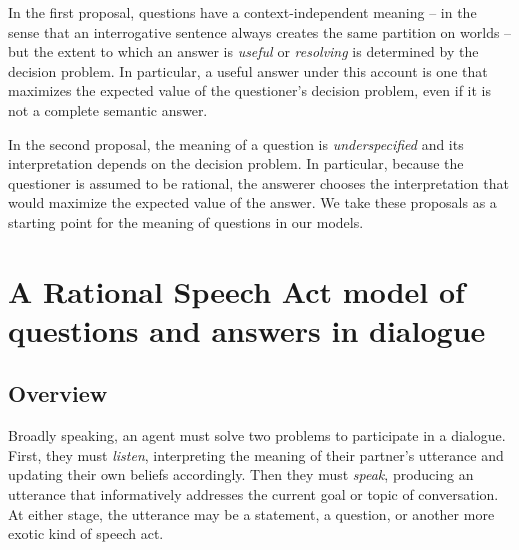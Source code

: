 \documentclass[12pt, floatsintext, jou]{apa6}
\begin{document}
In the first proposal, questions have a context-independent meaning -- in the sense that an interrogative sentence always creates the same partition on worlds -- but the extent to which an answer is \emph{useful} or \emph{resolving} is determined by the decision problem. In particular, a useful answer under this account is one that maximizes the expected value of the questioner's decision problem, even if it is not a complete semantic answer. 

In the second proposal, the meaning of a question is \emph{underspecified} and its interpretation depends on the decision problem. In particular, because the questioner is assumed to be rational, the answerer chooses the interpretation that would maximize the expected value of the answer. We take these proposals as a starting point for the meaning of questions in our models.

\section{A Rational Speech Act model of \\questions and answers in dialogue}

\subsection{Overview}

Broadly speaking, an agent must solve two problems to participate in a dialogue. 
First, they must \emph{listen}, interpreting the meaning of their partner's utterance and updating their own beliefs accordingly. 
Then they must \emph{speak}, producing an utterance that informatively addresses the current goal or topic of conversation. 
At either stage, the utterance may be a statement, a question, or another more exotic kind of speech act. 
\end{document}
